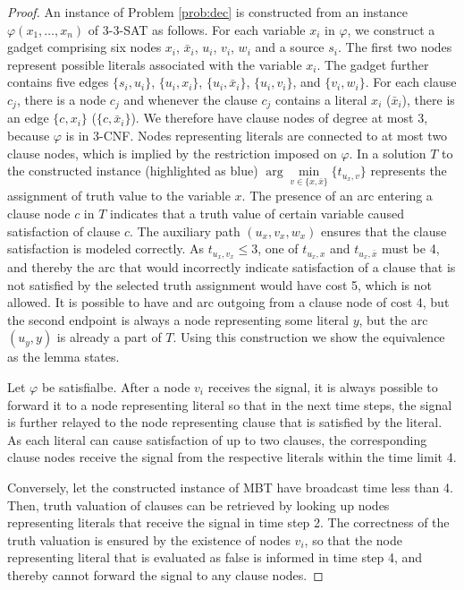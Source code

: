 \begin{proof}\label{prop:mbtnpc}
An instance of Problem \ref{prob:dec} is constructed from an instance $\varphi(x_1,\dots,x_n)$ of 3-3-SAT as follows.
For each variable $x_i$ in $\varphi$, we construct a gadget comprising six nodes $x_i$, $\bar{x}_i$, $u_i$, $v_i$, $w_i$ and a source $s_i$.
The first two nodes represent possible literals associated with the variable $x_i$.
The gadget further contains five edges $\{s_i,u_i\}$, $\{u_i,x_i\}$, $\{u_i,\bar{x}_i\}$, $\{u_i,v_i\}$, and $\{v_i,w_i\}$.
For each clause $c_j$, there is a node $c_j$ and whenever the clause $c_j$ contains a literal $x_i$ ($\bar{x}_i$), there is an edge $\{c,x_i\}$ ($\{c,\bar{x}_i\}$).
We therefore have clause nodes of degree at most 3, because $\varphi$ is in 3-CNF.
Nodes representing literals are connected to at most two clause nodes, which is implied by the restriction imposed on $\varphi$.
In a solution $T$ to the constructed instance (highlighted as blue)  $\arg\min\limits_{v\in\{x,\bar{x}\}}\{t_{u_x,v}\}$ represents the assignment of truth value to the variable $x$.
The presence of an arc entering a clause node $c$ in $T$ indicates that a truth value of certain variable caused satisfaction of clause $c$.
The auxiliary path $(u_x,v_x,w_x)$ ensures that the clause satisfaction is modeled correctly.
As $t_{u_x,v_x}\leq 3$, one of $t_{u_x,x}$ and $t_{u_x,\bar{x}}$ must be 4, 
and thereby the arc that would incorrectly indicate satisfaction of a clause that is not satisfied by the selected truth assignment would have cost 5, which is not allowed.
It is possible to have and arc outgoing from a clause node of cost 4, but the second endpoint is always a node representing some literal $y$, but the arc $(u_y,y)$ is already a part of $T$.
Using this construction we show the equivalence as the lemma states.

Let $\varphi$ be satisfialbe.
After a node $v_i$ receives the signal, it is always possible to forward it to a node representing literal so that in the next time steps,
the signal is further relayed to the node representing clause that is satisfied by the literal.
As each literal can cause satisfaction of up to two clauses, the corresponding clause nodes receive the signal from the respective literals within the time limit 4.

Conversely, let the constructed instance of MBT have broadcast time less than 4.
Then, truth valuation of clauses can be retrieved by looking up nodes representing literals that receive the signal in time step 2.
The correctness of the truth valuation is ensured by the existence of nodes $v_i$, so that the node representing literal that is evaluated as false is informed in time step 4, 
and thereby cannot forward the signal to any clause nodes.
\end{proof}
